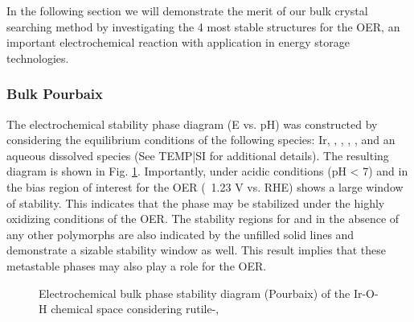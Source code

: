 
In the following section we will demonstrate the merit of our bulk crystal searching method by investigating the 4 most stable structures for the OER, an important electrochemical reaction with application in energy storage technologies.


\subsubsection{Bulk Pourbaix}

The electrochemical stability phase diagram (E vs. pH) was constructed by considering the equilibrium conditions of the following species: Ir, \rIrOtwo, \aIrOthree, \rIrOthree, \bIrOthree, and an aqueous dissolved  species (See TEMP|SI for additional details).
The resulting diagram is shown in Fig. \ref{fig:bulk_pourbaix}.
Importantly, under acidic conditions (pH < 7) and in the bias region of interest for the OER (~1.23 V vs. RHE) \aIrOthree shows a large window of stability.
This indicates that the \aIrOthree phase may be stabilized under the highly oxidizing conditions of the OER.
The stability regions for \rIrOthree and \bIrOthree in the absence of any other  polymorphs are also indicated by the unfilled solid lines and demonstrate a sizable stability window as well.
This result implies that these metastable phases may also play a role for the OER.

\begin{figure}
\centering
{}
\caption{\label{fig:bulk_pourbaix}
Electrochemical bulk phase stability diagram (Pourbaix) of the Ir-O-H chemical space considering rutile-,
}
\end{figure}

